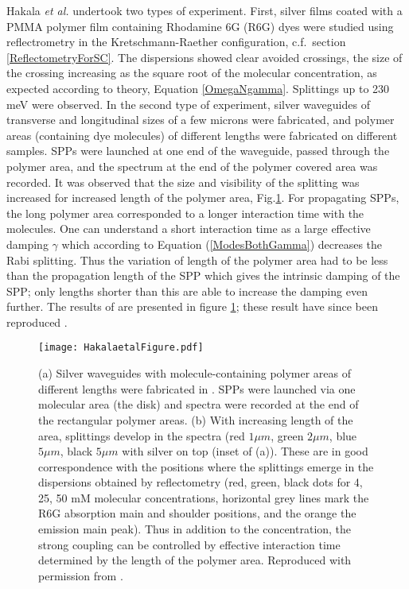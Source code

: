 \documentclass[12pt]{iopart}
\begin{document}
Hakala {\it et al.} \cite{Hakala2009} undertook two types of experiment. First, silver films coated with a PMMA polymer film containing Rhodamine 6G (R6G) dyes were studied using reflectrometry in the Kretschmann-Raether configuration, c.f.\ section \ref{ReflectometryForSC}. The dispersions showed clear avoided crossings, the size of the crossing increasing as the square root of the molecular concentration, as expected according to theory, Equation  \ref{OmegaNgamma}. Splittings up to 230 meV were observed. In the second type of experiment, silver waveguides of transverse and longitudinal sizes of a few microns were fabricated, and polymer areas (containing dye molecules) of different lengths were fabricated on different samples. SPPs were launched at one end of the waveguide, passed through the polymer area, and the spectrum at the end of the polymer covered area was recorded. It was observed that the size and visibility of the splitting was increased for increased length of the polymer area, Fig.\ref{Tommifigure}. For propagating SPPs, the long polymer area corresponded to a longer interaction time with the molecules. One can understand a short interaction time as a large effective 
damping $\gamma$ which according to Equation (\ref{ModesBothGamma}) decreases the Rabi splitting. Thus the variation of length of the polymer area had to be less than the propagation length of the SPP which gives the intrinsic damping of the SPP; only lengths shorter than this are able to increase the damping even further. The results of \cite{Hakala2009} are presented in figure \ref{Tommifigure}; these result have since been reproduced \cite{Moerland2011,Moerland22011}.

\begin{figure}
\texttt{[image: HakalaetalFigure.pdf]}
\caption{(a) Silver waveguides with molecule-containing polymer areas of different lengths were fabricated in \cite{Hakala2009}. SPPs were launched via one molecular area (the disk) and spectra were recorded at the end of the rectangular polymer areas. (b) With increasing length of the area, splittings develop in the spectra (red $1\mu m$, green $2\mu m$, blue $5\mu m$, black $5\mu m$ with silver on top (inset of (a)). These are in good correspondence with the positions where the splittings emerge in the dispersions obtained by reflectometry (red, green, black dots for 4, 25, 50 mM molecular concentrations, horizontal grey lines mark the R6G absorption main and shoulder positions, and the orange the emission main peak). Thus in addition to the concentration, the strong coupling can be controlled by effective interaction time determined by the length of the polymer area. Reproduced with permission from \cite{Hakala2009}.} 
\label{Tommifigure}
\end{figure}
\end{document}
